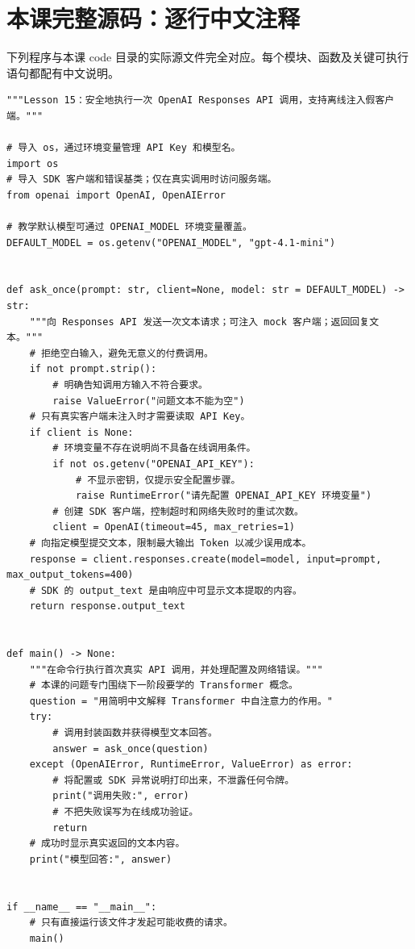 \documentclass[UTF8,11pt,a4paper]{ctexart}
\begin{document}
\section{本课完整源码：逐行中文注释}
下列程序与本课 code 目录的实际源文件完全对应。每个模块、函数及关键可执行语句都配有中文说明。
\begin{Verbatim}[fontsize=\scriptsize,breaklines=true,breakanywhere=true]
"""Lesson 15：安全地执行一次 OpenAI Responses API 调用，支持离线注入假客户端。"""

# 导入 os，通过环境变量管理 API Key 和模型名。
import os
# 导入 SDK 客户端和错误基类；仅在真实调用时访问服务端。
from openai import OpenAI, OpenAIError

# 教学默认模型可通过 OPENAI_MODEL 环境变量覆盖。
DEFAULT_MODEL = os.getenv("OPENAI_MODEL", "gpt-4.1-mini")


def ask_once(prompt: str, client=None, model: str = DEFAULT_MODEL) -> str:
    """向 Responses API 发送一次文本请求；可注入 mock 客户端；返回回复文本。"""
    # 拒绝空白输入，避免无意义的付费调用。
    if not prompt.strip():
        # 明确告知调用方输入不符合要求。
        raise ValueError("问题文本不能为空")
    # 只有真实客户端未注入时才需要读取 API Key。
    if client is None:
        # 环境变量不存在说明尚不具备在线调用条件。
        if not os.getenv("OPENAI_API_KEY"):
            # 不显示密钥，仅提示安全配置步骤。
            raise RuntimeError("请先配置 OPENAI_API_KEY 环境变量")
        # 创建 SDK 客户端，控制超时和网络失败时的重试次数。
        client = OpenAI(timeout=45, max_retries=1)
    # 向指定模型提交文本，限制最大输出 Token 以减少误用成本。
    response = client.responses.create(model=model, input=prompt, max_output_tokens=400)
    # SDK 的 output_text 是由响应中可显示文本提取的内容。
    return response.output_text


def main() -> None:
    """在命令行执行首次真实 API 调用，并处理配置及网络错误。"""
    # 本课的问题专门围绕下一阶段要学的 Transformer 概念。
    question = "用简明中文解释 Transformer 中自注意力的作用。"
    try:
        # 调用封装函数并获得模型文本回答。
        answer = ask_once(question)
    except (OpenAIError, RuntimeError, ValueError) as error:
        # 将配置或 SDK 异常说明打印出来，不泄露任何令牌。
        print("调用失败:", error)
        # 不把失败误写为在线成功验证。
        return
    # 成功时显示真实返回的文本内容。
    print("模型回答:", answer)


if __name__ == "__main__":
    # 只有直接运行该文件才发起可能收费的请求。
    main()
\end{Verbatim}
\end{document}

